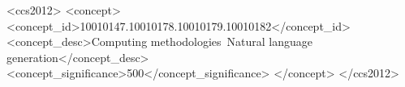 \documentclass[manuscript,screen,acmsmall]{acmart}
\begin{document}
\begin{CCSXML}
<ccs2012>
   <concept>
       <concept_id>10010147.10010178.10010179.10010182</concept_id>
       <concept_desc>Computing methodologies~Natural language generation</concept_desc>
       <concept_significance>500</concept_significance>
       </concept>
 </ccs2012>
\end{CCSXML}








\end{document}
